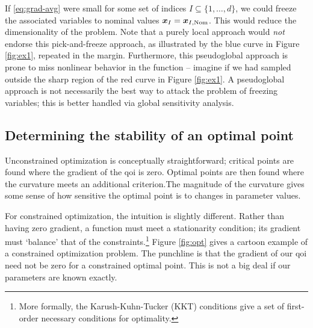 \documentclass[../primer.tex]{subfiles}
\begin{document}
If \eqref{eq:grad-avg} were small for some set of indices
\(I\subseteq\{1,\dots,d\}\), we could freeze the associated variables to nominal
values \(\boldsymbol{x}_{I}=\boldsymbol{x}_{I,\text{Nom}}\). This would reduce the dimensionality of the
problem. Note that a purely local approach would \emph{not} endorse this
pick-and-freeze approach, as illustrated by the blue curve in Figure
\ref{fig:ex1}, repeated in the margin. Furthermore, this pseudoglobal approach
is prone to miss nonlinear behavior in the function -- imagine if we had sampled
outside the sharp region of the red curve in Figure \ref{fig:ex1}. A
pseudoglobal approach is not necessarily the best way to attack the problem of
freezing variables; this is better handled via global sensitivity analysis.

\subsection{Determining the stability of an optimal point}
\label{sec:org26d8e84}
Unconstrained optimization is conceptually straightforward; critical points are
found where the gradient of the qoi is zero. Optimal points are then found where
the curvature meets an additional criterion.\footnotemark The magnitude of the
curvature gives some sense of how sensitive the optimal point is to changes in
parameter values.


For constrained optimization, the intuition is slightly different. Rather than
having zero gradient, a function must meet a stationarity condition; its
gradient must `balance' that of the constraints.\footnote{More formally, the
Karush-Kuhn-Tucker (KKT) conditions give a set of first-order necessary
conditions for optimality.} Figure \ref{fig:opt} gives a cartoon example of a
constrained optimization problem. The punchline is that the gradient of our qoi
need not be zero for a constrained optimal point. This is not a big deal if our
parameters are known exactly.
\end{document}
